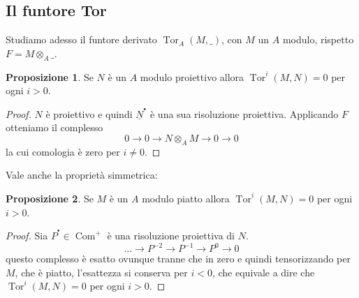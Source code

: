 \documentclass[a4paper,11pt,oneside]{book}
\newcommand{\A}{\mathcal{A}}
\newcommand{\B}{\mathcal{B}}
\newcommand{\complx}[1]{#1^{^\bullet}}
\DeclareMathOperator{\Ob}{Ob}
\DeclareMathOperator{\Com}{Com}
\DeclareMathOperator{\Tor}{Tor}
\theoremstyle{definition}
\newtheorem{prop}{Proposizione}
\newtheorem{oss}[section]{Osservazione}
\begin{document}
%  
%        
      
 \subsection{Il funtore Tor}

  
  Studiamo adesso il funtore derivato $\Tor_A(M,\_)$, con $M$ un $A$ modulo, rispetto $F=M\otimes_A \_ $.
  \begin{prop}
  Se $N$ \`e un $A$ modulo proiettivo allora $\Tor^i(M,N)=0$ per ogni $i>0$.
  \end{prop}
  \begin{proof}
   $N$ \`e proiettivo e quindi $\complx{\underline N}$ \`e una sua risoluzione proiettiva. Applicando
   $F$ otteniamo il complesso
   \[
	0\rightarrow 0 \rightarrow N\otimes_A M  \rightarrow 0 \rightarrow 0
      \]
   la cui comologia \`e zero per $i\neq 0$.
  \end{proof}

  Vale anche la proprietà simmetrica:
  \begin{prop}
  Se $M$ \`e un $A$ modulo piatto allora $\Tor^i(M,N)=0$ per ogni $i>0$.
  \end{prop}
 \begin{proof}
  Sia $\complx{P}\in\Com^+$ \`e una risoluzione proiettiva di $N$.
  \[
	\dots \rightarrow P^{-2}\rightarrow P^{-1} \rightarrow P^{0} \rightarrow 0
   \]
   questo complesso \`e esatto ovunque tranne che in zero e quindi tensorizzando per $M$, che \`e piatto,
   l'esattezza si conserva per $i<0$, che equivale a dire che$\Tor^i(M,N)=0$ per ogni $i>0$.
 \end{proof}
  
\end{document}

